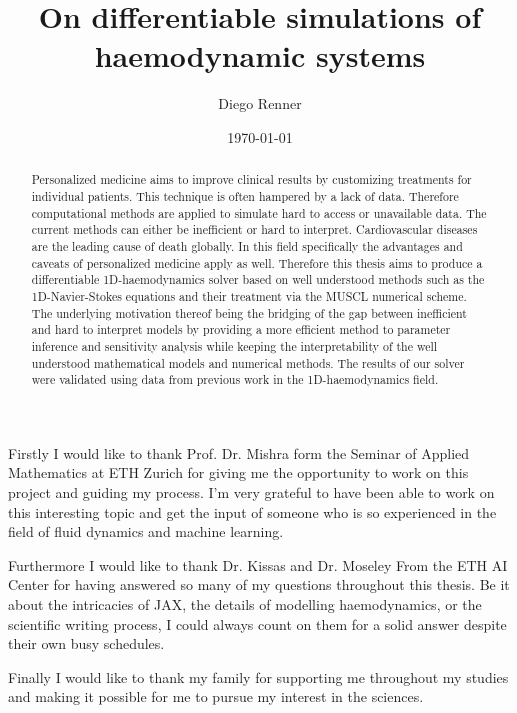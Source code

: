 \documentclass[a4paper, oneside]{discothesis}
\title{On differentiable simulations of haemodynamic systems}
\author{Diego Renner}
\institute{Dep. of Mathematics \\[2pt]
ETH Zürich}
\date{\today}
\begin{document}
\frontmatter %
\maketitle
\cleardoublepage

\begin{acknowledgements}
	Firstly I would like to thank Prof. Dr. Mishra form the Seminar of Applied Mathematics at ETH Zurich for giving me the opportunity to work on this project and guiding my process.	
	I'm very grateful to have been able to work on this interesting topic and get the input of someone who is so experienced in the field of fluid dynamics and machine learning.

	Furthermore I would like to thank Dr. Kissas and Dr. Moseley From the ETH AI Center for having answered so many of my questions throughout this thesis.
	Be it about the intricacies of JAX, the details of modelling haemodynamics, or the scientific writing process, I could always count on them for a solid answer despite their own busy schedules.

	Finally I would like to thank my family for supporting me throughout my studies and making it possible for me to pursue my interest in the sciences.

\end{acknowledgements}


\begin{abstract}
	Personalized medicine aims to improve clinical results by customizing treatments for individual patients.
	This technique is often hampered by a lack of data.
	Therefore computational methods are applied to simulate hard to access or unavailable data.
	The current methods can either be inefficient or hard to interpret.
	Cardiovascular diseases are the leading cause of death globally.
	In this field specifically the advantages and caveats of personalized medicine apply as well.
	Therefore this thesis aims to produce a differentiable 1D-haemodynamics solver based on well understood methods such as the 1D-Navier-Stokes equations and their treatment via the MUSCL numerical scheme.
	The underlying motivation thereof being the bridging of the gap between inefficient and hard to interpret models by providing a more efficient method to parameter inference and sensitivity analysis while keeping the interpretability of the well understood mathematical models and numerical methods.
	The results of our solver were validated using data from previous work in the 1D-haemodynamics field.

\end{abstract}
\end{document}
